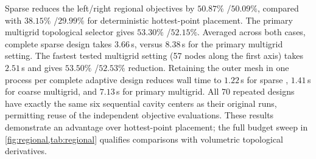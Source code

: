 Sparse \method{} reduces the left/right regional objectives by $50.87\%$ /\allowbreak $50.09\%$, compared with $38.15\%$ /\allowbreak $29.99\%$ for deterministic hottest-point placement. The primary multigrid topological selector gives $53.30\%$ /\allowbreak $52.15\%$. Averaged across both cases, complete sparse \method{} design takes $3.66$\,s, versus $8.38$\,s for the primary multigrid setting. The fastest tested multigrid setting (57 nodes along the first axis) takes $2.51$\,s and gives $53.50\%$ /\allowbreak $52.53\%$ reduction. Retaining the outer mesh in one process per complete adaptive design reduces wall time to $1.22$\,s for sparse \method{}, $1.41$\,s for coarse multigrid, and $7.13$\,s for primary multigrid. All 70 repeated designs have exactly the same six sequential cavity centers as their original runs, permitting reuse of the independent objective evaluations. These results demonstrate an advantage over hottest-point placement; the full budget sweep in \cref{fig:regional,tab:regional} qualifies comparisons with volumetric topological derivatives.
